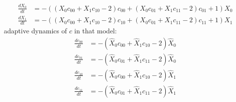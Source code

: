\documentclass{article}
\begin{document}
\[\begin{align*}
\frac{dX_{0}}{dt} &= -{\left({\left(X_{0} c_{00} + X_{1} c_{10} - 2\right)} c_{00} + {\left(X_{0} c_{01} + X_{1} c_{11} - 2\right)} c_{01} + 1\right)} X_{0}\\
\frac{dX_{1}}{dt} &= -{\left({\left(X_{0} c_{00} + X_{1} c_{10} - 2\right)} c_{10} + {\left(X_{0} c_{01} + X_{1} c_{11} - 2\right)} c_{11} + 1\right)} X_{1}
\end{align*} \
\]
adaptive dynamics of $c$ in that model:
\[\begin{align*}
\frac{dc_{00}}{dt} &= -{\left(\hat{X}_{0} c_{00} + \hat{X}_{1} c_{10} - 2\right)} \hat{X}_{0}\\
\frac{dc_{01}}{dt} &= -{\left(\hat{X}_{0} c_{01} + \hat{X}_{1} c_{11} - 2\right)} \hat{X}_{0}\\
\frac{dc_{10}}{dt} &= -{\left(\hat{X}_{0} c_{00} + \hat{X}_{1} c_{10} - 2\right)} \hat{X}_{1}\\
\frac{dc_{11}}{dt} &= -{\left(\hat{X}_{0} c_{01} + \hat{X}_{1} c_{11} - 2\right)} \hat{X}_{1}
\end{align*} \
\]
\end{document}
